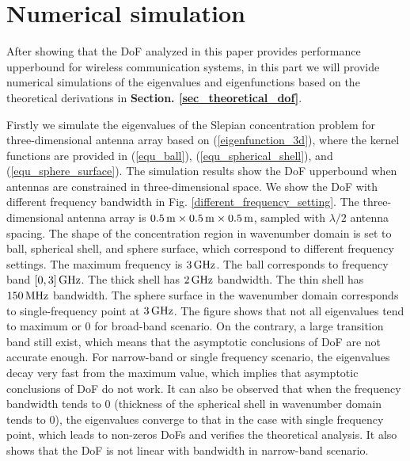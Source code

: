 \documentclass[12pt,draftclsnofoot,journal,onecolumn]{IEEEtran}
\begin{document}
	\section{Numerical simulation}
	
	After showing that the DoF analyzed in this paper provides performance upperbound for wireless communication systems, in this part we will provide numerical simulations of the eigenvalues and eigenfunctions based on the theoretical derivations in {\bf Section. \ref{sec_theoretical_dof}}. 
	
	Firstly we simulate the eigenvalues of the Slepian concentration problem for three-dimensional antenna array based on (\ref{eigenfunction_3d}), where the kernel functions are provided in (\ref{equ_ball}), (\ref{equ_spherical_shell}), and (\ref{equ_sphere_surface}). The simulation results show the DoF upperbound when antennas are constrained in three-dimensional space.
	We show the DoF with different frequency bandwidth in Fig. \ref{different_frequency_setting}. The three-dimensional antenna array is $0.5\,{\rm m} \times 0.5\,{\rm m} \times 0.5\,{\rm m}$, sampled with $\lambda/2$ antenna spacing. The shape of the concentration region in wavenumber domain is set to ball, spherical shell, and sphere surface, which correspond to different frequency settings.
	The maximum frequency is $3\,{\rm GHz}$. The ball corresponds to frequency band $[0,3]\,{\rm GHz}$. The thick shell has $2\,{\rm GHz}$ bandwidth. The thin shell has $150\,{\rm MHz}$ bandwidth. The sphere surface in the wavenumber domain corresponds to single-frequency point at $3\,{\rm GHz}$. The figure shows that not all eigenvalues tend to maximum or 0 for broad-band scenario. On the contrary, a large transition band still exist, which means that the asymptotic conclusions of DoF are not accurate enough. For narrow-band or single frequency scenario, the eigenvalues decay very fast from the maximum value, which implies that asymptotic conclusions of DoF do not work.
	It can also be observed that when the frequency bandwidth tends to 0 (thickness of the spherical shell in wavenumber domain tends to 0), the eigenvalues converge to that in the case with single frequency point, which leads to non-zeros DoFs and verifies the theoretical analysis. It also shows that the DoF is not linear with bandwidth in narrow-band scenario.
	 
\end{document}
